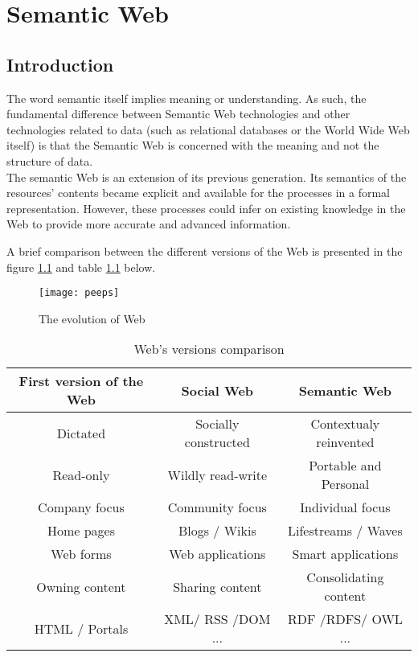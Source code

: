 \chapter{Semantic Web}
\label{chap_sem_web}

\section{Introduction}

The word semantic \cite{sem1springer} itself implies meaning or understanding. As such, the fundamental difference between Semantic Web technologies and other technologies related to data (such as relational databases or the World Wide Web itself) is that the Semantic Web is concerned with the meaning and not the structure of data.\\
The semantic Web is an extension of its previous generation.  Its semantics of the resources' contents became explicit and available for the processes in a formal representation. However, these processes could infer on existing knowledge in the Web to provide more accurate and advanced information.

A brief comparison between the different versions of the Web is presented in the figure \ref{comparison} and table \ref{comparisontab} below.

\begin{figure}[H]
\centering
\texttt{[image: peeps]}
\caption{The evolution of Web}
\label{comparison}
\end{figure}



\begin{table}[H]
\centering
\caption{Web's versions comparison}
\label{comparisontab}
\begin{tabular}{|c|c|c|}
\hline
\rowcolor[HTML]{C0C0C0} 
First version of the Web        & Social Web            & Semantic Web    \\ \hline    
Dictated       & Socially constructed & Contextualy reinvented \\ \hline
Read-only      & Wildly read-write    & Portable and Personal                          \\ \hline
Company focus  & Community focus      & Individual focus                               \\ \hline
Home pages     & Blogs / Wikis        & Lifestreams / Waves                            \\ \hline

Web forms      & Web applications     & Smart applications                             \\ \hline
Owning content & Sharing content      & Consolidating content                          \\ \hline
HTML / Portals & XML/ RSS /DOM ...   & RDF /RDFS/ OWL ...                     \\ \hline
\end{tabular}
\end{table}


